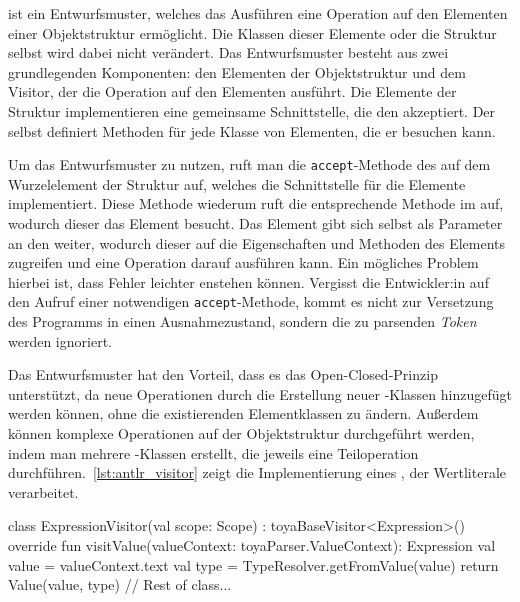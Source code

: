 \visitor ist ein Entwurfsmuster, welches das Ausführen eine Operation auf den Elementen einer Objektstruktur ermöglicht. Die Klassen dieser Elemente oder die Struktur selbst wird dabei nicht verändert. Das Entwurfsmuster besteht aus zwei grundlegenden Komponenten: den Elementen der Objektstruktur und dem Visitor, der die Operation auf den Elementen ausführt. Die Elemente der Struktur implementieren eine gemeinsame Schnittstelle, die den \visitor akzeptiert. Der \visitor selbst definiert Methoden für jede Klasse von Elementen, die er besuchen kann.

Um das Entwurfsmuster zu nutzen, ruft man die \texttt{accept}-Methode des \visitors auf dem Wurzelelement der Struktur auf, welches die Schnittstelle für die Elemente implementiert. Diese Methode wiederum ruft die entsprechende Methode im \visitor auf, wodurch dieser das Element besucht. Das Element gibt sich selbst als Parameter an den \visitor weiter, wodurch dieser auf die Eigenschaften und Methoden des Elements zugreifen und eine Operation darauf ausführen kann. Ein mögliches Problem hierbei ist, dass Fehler leichter enstehen können. Vergisst die Entwickler:in auf den Aufruf einer notwendigen \texttt{accept}-Methode, kommt es nicht zur Versetzung des Programms in einen Ausnahmezustand, sondern die zu parsenden \textit{Token} werden ignoriert.

Das \visitor Entwurfsmuster hat den Vorteil, dass es das Open-Closed-Prinzip unterstützt, da neue Operationen durch die Erstellung neuer \visitor-Klassen hinzugefügt werden können, ohne die existierenden Elementklassen zu ändern. Außerdem können komplexe Operationen auf der Objektstruktur durchgeführt werden, indem man mehrere \visitor-Klassen erstellt, die jeweils eine Teiloperation durchführen.~\autoref{lst:antlr_visitor} zeigt die Implementierung eines \visitors, der Wertliterale verarbeitet.

\begin{ToyaCode}[numbers=none, caption={Implementierung eines \visitors für Wertliterale.}, label=lst:antlr_visitor]
class ExpressionVisitor(val scope: Scope) : toyaBaseVisitor<Expression>() {
    override fun visitValue(valueContext: toyaParser.ValueContext): Expression {
        val value = valueContext.text
        val type = TypeResolver.getFromValue(value)
        return Value(value, type)
    }
    // Rest of class...
}
\end{ToyaCode}